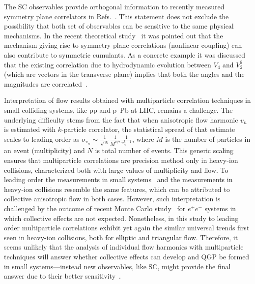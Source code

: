 The SC observables provide orthogonal information to recently measured symmetry plane correlators in Refs.~\cite{ALICE:2011ab,Adare:2011tg,Aad:2014fla}. This statement does not exclude the possibility that both set of observables can be sensitive to the same physical mechanisms. In the recent theoretical study~\cite{Giacalone:2016afq} it was pointed out that the mechanism giving rise to symmetry plane correlations (nonlinear coupling) can also contribute to symmetric cumulants. As a concrete example it was discussed that the existing correlation due to hydrodynamic evolution between $V_4$ and $V_2^2$ (which are vectors in the transverse plane) implies that both the angles and the magnitudes are correlated~\cite{Giacalone:2016afq}. 

Interpretation of flow results obtained with multiparticle correlation techniques in small colliding systems, like pp and p--Pb at LHC, remains a challenge. The underlying difficulty stems from the fact that when anisotropic flow harmonic $v_n$ is estimated with $k$-particle correlator, the statistical spread of that estimate scales to leading order as $\sigma_{v_{n}}\sim\frac{1}{\sqrt{N}}\frac{1}{M^{k/2}}\frac{1}{v_{n}^{k-1}}$, where $M$ is the number of particles in an event (multiplicity) and $N$ is total number of events. This generic scaling ensures that multiparticle correlations are precision method only in heavy-ion collisions, characterized both with large values of multiplicity and flow. To leading order the measurements in small systems~\cite{Aad:2013fja,Abelev:2014mda,Khachatryan:2015waa,Adamczyk:2015xjc,Adare:2015ctn} and the measurements in heavy-ion collisions resemble the same features, which can be attributed to collective anisotropic flow in both cases. However, such interpretation is challenged by the outcome of recent Monte Carlo study~\cite{Loizides:2016tew} for $e^+e^-$ systems in which collective effects are not expected. Nonetheless, in this study to leading order multiparticle correlations exhibit yet again the similar universal trends first seen in heavy-ion collisions, both for elliptic and triangular flow. Therefore, it seems unlikely that the analysis of individual flow harmonics with multiparticle techniques will answer whether collective effects can develop and QGP be formed in small systems---instead new observables, like SC, might provide the final answer due to their better sensitivity~\cite{Niemi:2012aj,ALICE:2016kpq}.


